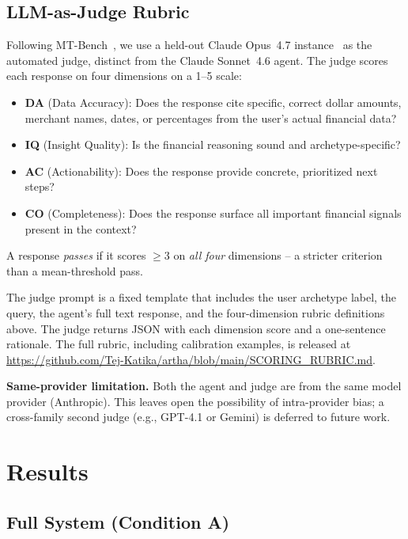\documentclass[conference]{IEEEtran}
\begin{document}
\subsection{LLM-as-Judge Rubric}
\label{sec:rubric}

Following MT-Bench~\cite{mtbench}, we use a held-out Claude
Opus~4.7 instance~\cite{claude_opus} as the automated judge,
distinct from the Claude Sonnet~4.6 agent. The judge scores each
response on four dimensions on a 1--5 scale:

\begin{itemize}
  \item \textbf{DA} (Data Accuracy): Does the response cite
    specific, correct dollar amounts, merchant names, dates, or
    percentages from the user's actual financial data?
  \item \textbf{IQ} (Insight Quality): Is the financial reasoning
    sound and archetype-specific?
  \item \textbf{AC} (Actionability): Does the response provide
    concrete, prioritized next steps?
  \item \textbf{CO} (Completeness): Does the response surface all
    important financial signals present in the context?
\end{itemize}

A response \emph{passes} if it scores $\geq 3$ on \emph{all four}
dimensions -- a stricter criterion than a mean-threshold pass.

The judge prompt is a fixed template that includes the user
archetype label, the query, the agent's full text response, and
the four-dimension rubric definitions above. The judge returns
JSON with each dimension score and a one-sentence rationale. The
full rubric, including calibration examples, is released at
\url{https://github.com/Tej-Katika/artha/blob/main/SCORING_RUBRIC.md}.

\textbf{Same-provider limitation.} Both the agent and judge are
from the same model provider (Anthropic). This leaves open the
possibility of intra-provider bias; a cross-family second judge
(e.g., GPT-4.1 or Gemini) is deferred to future work.

\section{Results}

\subsection{Full System (Condition A)}
\end{document}
